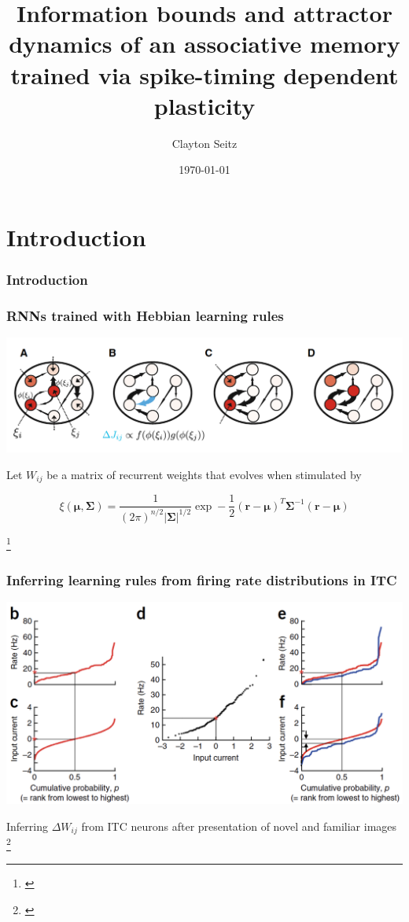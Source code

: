 \documentclass{beamer}
\begin{document}
\title{Information bounds and attractor dynamics of an associative memory trained via spike-timing dependent plasticity}  
\author{Clayton Seitz}
\date{\today} 

\begin{frame}[plain]
\titlepage
\end{frame}

\section{Introduction} 

\begin{frame}[plain]
\frametitle{Introduction} 

\end{frame}

\begin{frame}[plain]
\frametitle{RNNs trained with Hebbian learning rules}

\begin{center}
\includegraphics[scale=0.5]{network-diagram}
\end{center}

Let $W_{ij}$ be a matrix of recurrent weights that evolves when stimulated by 

\begin{equation*}
\xi(\bm{\mu}, \bm{\Sigma}) = \frac{1}{(2\pi)^{n/2}|\bm{\Sigma}|^{1/2}}\exp-\frac{1}{2}(\bm{r}-\bm{\mu})^{T}\bm{\Sigma}^{-1}(\bm{r}-\bm{\mu})
\end{equation*}

\footnote{\cite{peirera}}

\end{frame}
\begin{frame}[plain]
\frametitle{Inferring learning rules from firing rate distributions in ITC}

\begin{center}
\includegraphics[scale=0.5]{learning-rules}
\end{center}

Inferring $\Delta W_{ij}$ from ITC neurons after presentation of novel and familiar images
\footnote{\cite{lim}}

\end{frame}
\end{document}
